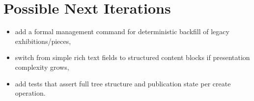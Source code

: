 \documentclass[11pt,a4paper]{article}
\begin{document}
\section{Possible Next Iterations}
\begin{itemize}[leftmargin=*]
    \item add a formal management command for deterministic backfill of legacy exhibitions/pieces,
    \item switch from simple rich text fields to structured content blocks if presentation complexity grows,
    \item add tests that assert full tree structure and publication state per create operation.
\end{itemize}
\end{document}
